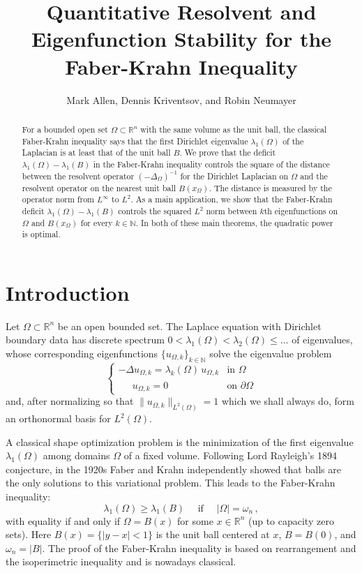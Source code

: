 \documentclass[10pt, reqno]{amsart}
\numberwithin{equation}{section}
\def\R{{\mathbb R}}
\def\W{\Omega}
\def\om{\omega}
\begin{document}
\setcounter{secnumdepth}{4}
\setcounter{tocdepth}{1}
\begin{abstract}
For a bounded open set $\Omega \subset \mathbb{R}^n$ with the same volume as the unit ball, the classical Faber-Krahn inequality says that the first Dirichlet eigenvalue $\lambda_1(\Omega)$ of the Laplacian is at least that of the unit ball $B$. We prove that the deficit $\lambda_1(\W)- \lambda_1(B)$ in the Faber-Krahn inequality controls the square of the distance between the resolvent operator $(-\Delta_\Omega)^{-1}$ for the Dirichlet Laplacian on $\Omega$ and the resolvent operator on the nearest unit ball $B(x_\Omega)$. The distance is measured by the operator norm from $L^{\infty}$ to $L^2$. As a main application, we show that the Faber-Krahn deficit  $\lambda_1(\Omega)- \lambda_1(B)$ controls the squared $L^2$ norm between $k$th eigenfunctions on $\W$ and $B(x_\Omega)$ for every $k \in \mathbb{N}.$ In both of these main theorems, the quadratic power is optimal.
\end{abstract}
	\title[Resolvent and Eigenfunction Stability for the Faber-Krahn Inequality]{Quantitative Resolvent  and Eigenfunction Stability for the Faber-Krahn Inequality}
    \author{Mark Allen, Dennis Kriventsov, and Robin Neumayer}
\maketitle


\section{Introduction}
Let  $\Omega \subset \R^n$ be an open bounded set. The Laplace equation with Dirichlet boundary data has  discrete spectrum $0 < \lambda_1(\W) <  \lambda_2(\W) \leq \dots$ of eigenvalues, whose corresponding eigenfunctions $\{ u_{\W, k} \}_{k \in \mathbb{N}}$ solve the eigenvalue problem
\[
\begin{cases}
    -\Delta u_{\W,k} = \lambda_k(\W) \, u_{\W,k} & \text {in } \W\\
  \quad \ \   u_{\W,k} = 0 & \text{on } \partial \W
\end{cases}
\]
and, after normalizing so that $\| u_{\W,k}\|_{L^2(\W)} = 1$ which we shall always do,  form an orthonormal basis for $L^2(\W)$. 

A classical shape optimization problem is the minimization of the first eigenvalue $\lambda_1(\W)$ among domains $\W$ of a fixed volume. Following Lord Rayleigh's 1894 conjecture, in the 1920s Faber \cite{Faber23} and Krahn \cite{Krahn25} independently showed that balls are the only solutions to this variational problem. This leads to the Faber-Krahn inequality:
\begin{equation}\label{eqn: FK intro}
    \lambda_1(\W ) \geq \lambda_1(B)  \quad \text{ if } \quad|\W| = \omega_n\,,
\end{equation}
with equality if and only if $\W = B(x)$ for some $x\in \R^n$ (up to capacity zero sets).
Here $B(x) = \{|y-x|<1\}$ is the unit ball centered at $x$,  $B= B(0)$, and $\om_n = |B|$. The proof of the Faber-Krahn inequality is based on rearrangement and the isoperimetric inequality and  is nowadays classical.
\end{document}
